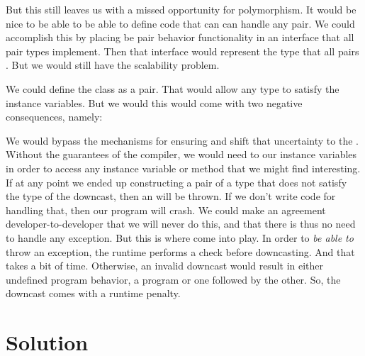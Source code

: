 But this still leaves us with a missed opportunity for polymorphism. It would be nice to be able to be able to define code that can can handle any pair. We could accomplish this by placing be pair behavior functionality in an interface that all pair types implement. Then that interface would represent the type that all pairs . But we would still have the scalability problem.

We could define the class as a  pair. That would allow any type to satisfy the instance variables. But we would this would come with two negative consequences, namely:
\begin{enumerate}
   We would bypass the  mechanisms for ensuring  and shift that uncertainty to the . Without the guarantees of the compiler, we would need to  our instance variables in order to access any instance variable or method that we might find interesting. If at any point we ended up constructing a pair of a type that does not satisfy the type of the downcast, then an  will be thrown. If we don't write code for handling that, then our program will crash. We could make an agreement developer-to-developer that we will never do this, and that there is thus no need to handle any exception. But this is where  come into play.
   In order to \textsl{be able to} throw an exception, the runtime performs a check before downcasting. And that takes a bit of time. Otherwise, an invalid downcast would result in either undefined program behavior, a program  or one followed by the other. So, the downcast comes with a runtime penalty.
\end{enumerate}

\section{Solution}


